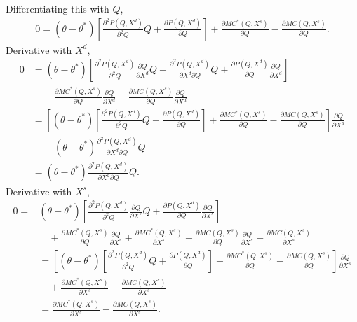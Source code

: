 \documentclass[11pt, a4paper]{article}
\theoremstyle{remark}
\begin{document}
Differentiating this with $Q$,
\begin{align}
    0 = (\theta - \theta^{*})\left[ \frac{\partial^2 P(Q,X^{d})}{\partial^2 Q}Q + \frac{\partial P(Q,X^{d})}{\partial Q} \right] + \frac{\partial MC^{*}(Q,X^{s})}{\partial Q} - \frac{\partial MC(Q,X^{s})}{\partial Q}.\label{eq:foc_with_Q}
\end{align}
Derivative with $X^{d}$,
\begin{align}
    0 & =  (\theta - \theta^{*})\left[ \frac{\partial^2 P(Q,X^{d})}{\partial^2 Q}\frac{\partial Q}{\partial X^{d}} Q  + \frac{\partial^2 P(Q,X^{d})}{\partial X^{d}\partial Q}Q + \frac{\partial P(Q,X^{d})}{\partial Q} \frac{\partial Q}{\partial X^{d}}\right]\\
    &\quad + \frac{\partial MC^{*}(Q,X^{s})}{\partial Q}\frac{\partial Q}{\partial X^{d}} - \frac{\partial MC(Q,X^{s})}{\partial Q}\frac{\partial Q}{\partial X^{d}}\\
    & = \left[(\theta - \theta^{*})\left[ \frac{\partial^2 P(Q,X^{d})}{\partial^2 Q}Q + \frac{\partial P(Q,X^{d})}{\partial Q} \right] + \frac{\partial MC^{*}(Q,X^{s})}{\partial Q} - \frac{\partial MC(Q,X^{s})}{\partial Q}\right] \frac{\partial Q}{\partial X^{d}}\\
    &\quad + (\theta - \theta^{*})\frac{\partial^2 P(Q,X^{d})}{\partial X^{d}\partial Q}Q \\
    & = (\theta - \theta^{*})\frac{\partial^2 P(Q,X^{d})}{\partial X^{d}\partial Q}Q.\label{eq:foc_with_X_d}
\end{align}
Derivative with $X^{s}$,
\begin{align}
    0 = & (\theta - \theta^{*})\left[ \frac{\partial^2 P(Q,X^{d})}{\partial^2 Q}\frac{\partial Q}{\partial X^{s}} Q  + \frac{\partial P(Q,X^{d})}{\partial Q} \frac{\partial Q}{\partial X^{s}}\right]\\
    &\quad + \frac{\partial MC^{*}(Q,X^{s})}{\partial Q}\frac{\partial Q}{\partial X^{s}} + \frac{\partial MC^{*}(Q,X^{s})}{\partial X^{s}} - \frac{\partial MC(Q,X^{s})}{\partial Q}\frac{\partial Q}{\partial X^{s}} - \frac{\partial MC(Q,X^{s})}{\partial X^{s}}\\
    & = \left[(\theta - \theta^{*})\left[ \frac{\partial^2 P(Q,X^{d})}{\partial^2 Q}Q + \frac{\partial P(Q,X^{d})}{\partial Q} \right] + \frac{\partial MC^{*}(Q,X^{s})}{\partial Q} - \frac{\partial MC(Q,X^{s})}{\partial Q}\right] \frac{\partial Q}{\partial X^{s}}\\
    & \quad +  \frac{\partial MC^{*}(Q,X^{s})}{\partial X^{s}} -  \frac{\partial MC(Q,X^{s})}{\partial X^{s}}\\
    & = \frac{\partial MC^{*}(Q,X^{s})}{\partial X^{s}} -  \frac{\partial MC(Q,X^{s})}{\partial X^{s}}.\label{eq:foc_with_X_s}
\end{align}
\end{document}
